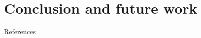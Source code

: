 \documentclass[10pt]{beamer}
\begin{document}

\section{Conclusion and future work}


\begin{frame}[allowframebreaks]{References}

  
  

\end{frame}
\end{document}
